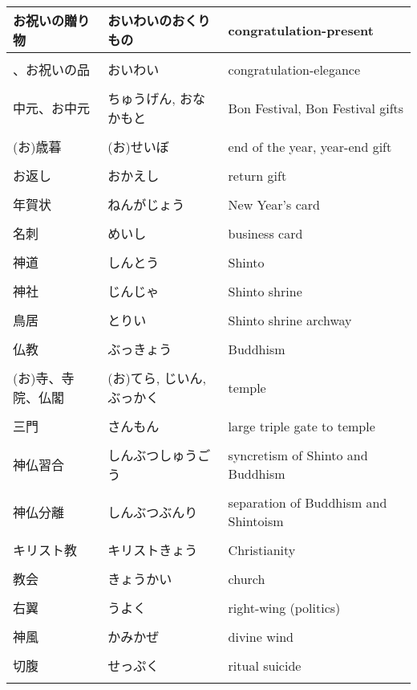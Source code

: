 \documentclass{article}
\begin{document}
\begin{tabular}{ l | p{6.7cm} | p{7.5cm} }
お祝いの贈り物 & おいわいのおくりもの & congratulation-present\\ \hline \\[-1em]
、お祝いの品 & おいわい & congratulation-elegance\\ \hline \\[-1em]
中元、お中元 & ちゅうげん, おなかもと & Bon Festival, Bon Festival gifts\\ \hline \\[-1em]
(お)歳暮 & (お)せいぼ & end of the year, year-end gift\\ \hline \\[-1em]
お返し & おかえし & return gift\\ \hline \\[-1em]
年賀状 & ねんがじょう & New Year's card\\ \hline \\[-1em]
名刺	& めいし & business card \\ \hline \\[-1em]
神道 & しんとう & Shinto\\ \hline \\[-1em]
神社 & じんじゃ & Shinto shrine\\ \hline \\[-1em]
鳥居 & とりい & Shinto shrine archway\\ \hline \\[-1em]
仏教 & ぶっきょう & Buddhism\\ \hline \\[-1em]
(お)寺、寺院、仏閣	& (お)てら, じいん, ぶっかく & temple\\ \hline \\[-1em]
三門	& さんもん & large triple gate to temple\\ \hline \\[-1em]
神仏習合	& しんぶつしゅうごう & syncretism of Shinto and Buddhism\\ \hline \\[-1em]
神仏分離	& しんぶつぶんり & separation of Buddhism and Shintoism\\ \hline \\[-1em]
キリスト教 & キリストきょう & Christianity\\ \hline \\[-1em]
教会 & きょうかい & church\\ \hline \\[-1em]
右翼	& うよく & right-wing (politics)\\ \hline \\[-1em]
神風	& かみかぜ & divine wind\\ \hline \\[-1em]
切腹 & せっぷく & ritual suicide\\ \hline \\[-1em]
\end{tabular}
\end{document}
